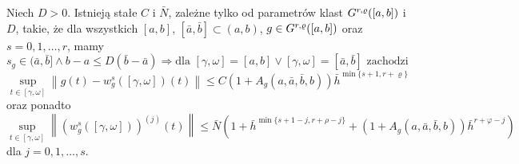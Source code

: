 \documentclass[oik, pdftex, robocza, man]{mgrwms}
\begin{document}
    \begin{stw} \label{2014_stw2}
        Niech $D > 0$. Istnieją stałe $C$ i $\bar{N}$, zależne tylko od parametrów klast $G^{r,\varrho}([a,b])$ i $D$, takie, że dla wszystkich $[a,b]$, $[\bar{a}, \bar{b}] \subset (a,b)$, $g \in G^{r,\varrho}([a,b])$ oraz $s=0,1,\dots,r$, mamy
        \begin{equation*}
            s_{g} \in (\bar{a}, \bar{b}] \land b-a \leq D(\bar{b}-\bar{a}) \Longrightarrow \text{dla } [\gamma, \omega]=[a, b] \vee [\gamma, \omega]=[\bar{a}, \bar{b}] \text{ zachodzi }
        \end{equation*}
        \begin{equation} \label{eq:19}
            \sup _{t \in[\gamma, \omega]}\left\|g(t)-w_{g}^{s}([\gamma, \omega])(t)\right\| \leq C\left(1+A_{g}(a, \bar{a}, \bar{b}, b)\right) \bar{h}^{\min \{s+1, r+\varrho\}}
        \end{equation}
        oraz ponadto
        \begin{equation*} \label{eq:20}
            \sup _{t \in[\gamma, \omega]}\left\|\left(w_{g}^{s}([\gamma, \omega])\right)^{(j)}(t)\right\| \leq \bar{N}\left(1+\bar{h}^{\min \{s+1-j, r+\rho-j\}}+\left(1+A_{g}(a, \bar{a}, \bar{b}, b)\right) \bar{h}^{r+\varphi-j}\right)
        \end{equation*}
        dla $j=0,1,\dots,s$.
    \end{stw}
\end{document}
